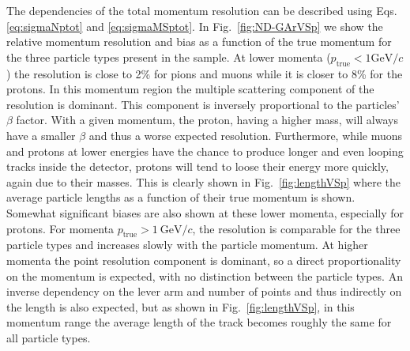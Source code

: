The dependencies of the total momentum resolution can be described using Eqs. \ref{eq:sigmaNptot} and \ref{eq:sigmaMSptot}. In Fig.~\ref{fig:ND-GArVSp} we show the relative momentum resolution and bias as a function of the true momentum for the three particle types present in the sample. At lower momenta ($p_{\text{true}}<1\text{GeV/}c$) the resolution is close to 2\% for pions and muons while it is closer to 8\% for the protons. In this momentum region the multiple scattering component of the resolution is dominant. This component is inversely proportional to the particles' $\beta$ factor. With a given momentum, the proton, having a higher mass, will always have a smaller $\beta$ and thus a worse expected resolution. Furthermore, while muons and protons at lower energies have the chance to produce longer and even looping tracks inside the detector, protons will tend to loose their energy more quickly, again due to their masses. This is clearly shown in Fig.~\ref{fig:lengthVSp} where the average particle lengths as a function of their true momentum is shown. Somewhat significant biases are also shown at these lower momenta, especially for protons. For momenta $p_{\text{true}}>1~\text{GeV/}c$, the resolution is comparable for the three particle types and increases slowly with the particle momentum. At higher momenta the point resolution component is dominant, so a direct proportionality on the momentum is expected, with no distinction between the particle types. An inverse dependency on the lever arm and number of points and thus indirectly on the length is also expected, but as shown in Fig.~\ref{fig:lengthVSp}, in this momentum range the average length of the track becomes roughly the same for all particle types.

